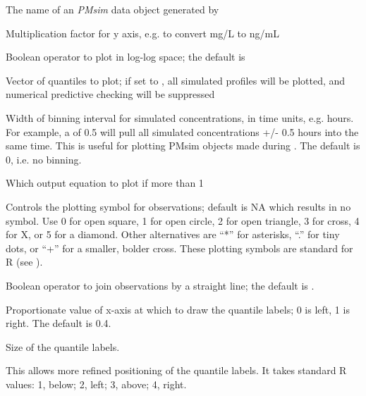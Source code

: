 \documentclass[a4paper]{book}
\begin{document}
%
\begin{Arguments}
\begin{ldescription}
\item[\code{x}] The name of an \emph{PMsim} data object generated by 

\item[\code{mult}] Multiplication factor for y axis, e.g. to convert mg/L to ng/mL

\item[\code{log}] Boolean operator to plot in log-log space; the default is 

\item[\code{probs}] Vector of quantiles to plot; if set to , all simulated profiles will be plotted,
and numerical predictive checking will be suppressed

\item[\code{binSize}] Width of binning interval for simulated concentrations, in time units, e.g. hours.  For example,
a  of 0.5 will pull all simulated concentrations +/- 0.5 hours into the same time.  This is useful
for plotting PMsim objects made during . The default is 0, i.e. no binning.

\item[\code{outeq}] Which output equation to plot if more than 1

\item[\code{pch}] Controls the plotting symbol for observations; default is NA which results in no symbol.
Use 0 for open square, 1 for open circle, 2 for open triangle, 3 for cross, 4 for X, or 5 for a diamond.
Other alternatives are ``*'' for asterisks, ``.'' for tiny dots, or ``+'' for a smaller,
bolder cross.  These plotting symbols are standard for R (see ).

\item[\code{join}] Boolean operator to join observations by a straight line; the default is .

\item[\code{x.qlab}] Proportionate value of x-axis at which to draw the quantile labels; 0 is left, 1 is right.
The default is 0.4.

\item[\code{cex.qlab}] Size of the quantile labels.

\item[\code{pos.qlab}] This allows more refined positioning of the quantile labels.  It takes standard R
values: 1, below; 2, left; 3, above; 4, right.


\end{ldescription}
\end{Arguments}
\end{document}
